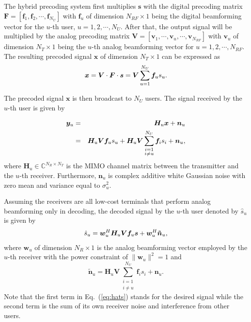 \documentclass[10pt,journal,twocolumn,twoside]{IEEEtran}
\begin{document}
The hybrid precoding system first multiplies ${\bm s}$ with the digital precoding matrix $\bm{F}=\left[{\bm f}_1,{\bm f}_2,\cdots, {\bm f}_{N_U}\right]$ with ${\bm f}_u$ of dimension $N_{RF}\times 1$ being the digital beamforming vector for the $u$-th user, $u=1,2,\cdots,N_U$. After that, the output signal will be multiplied by the analog precoding matrix $\bm{V}=\left[{\bm v}_1,\cdots,{\bm v}_u,\cdots,{\bm v}_{N_{RF}}\right]$ with ${\bm v}_u$ of dimension $N_T\times 1$ being the $u$-th analog beamforming vector for $u = 1,2,\cdots,N_{RF}$. The resulting precoded signal $\bm x$ of dimension $N_T\times 1$  can be expressed as
\begin{equation}{\label{eq:transx1}}
{\bm x} = \bm{V}\cdot \bm{F}\cdot\bm{s}= \bm{V}\sum_{u=1}^{N_U}\bm{f}_u s_u.
\end{equation}

The precoded signal $\bm x$ is then broadcast to $N_U$ users. The signal received by the $u$-th user is given by

\begin{eqnarray}{\label{eq:transx2}}
{\bm y}_u &=& \bm{H}_u \bm{x} + \bm{n}_u\\
&=&\bm{H}_u \bm{V}\bm{f}_us_u+\bm{H}_u \bm{V}\sum_{\substack{i=1 \\ i\neq u}}^{N_U}\bm{f}_is_i+\bm{n}_u,
\end{eqnarray}
where $\bm{H}_u$$\in\mathbb{C}^{N_R\times N_T}$ is the MIMO channel matrix between the transmitter and the $u$-th receiver\cite{el2014spatially}. Furthermore, $\bm{n}_u$ is complex additive white Gaussian noise with zero mean and variance equal to $\sigma_u^2$.

Assuming the receivers are all low-cost terminals that perform analog beamforming only in decoding, the decoded signal by the $u$-th user denoted by $\hat{s}_u$ is given by
\begin{equation}{\label{eq:hats}}
\hat{s}_u = \bm{w}_u^H \bm{H}_u \bm{V} \bm{f}_{u} \bm{s} + \bm{w}_u^H \bm{\tilde{n}}_u,
\end{equation}
where ${\bm w}_u$ of dimension $N_R\times 1$ is the analog beamforming vector employed by the $u$-th receiver with the power constraint of $\|\bm{w}_u\|^2=1$ and
\begin{equation}
\bm{\tilde{n}}_u=\bm{H}_u \bm{V}\sum_{\substack{i=1 \\ i\neq u}}^{N_U}\bm{f}_is_i+\bm{n}_u.
\end{equation}
Note that the first term in Eq.~(\ref{eq:hats}) stands for the desired signal while the second term is the sum of its own receiver noise and interference from other users.
\end{document}
